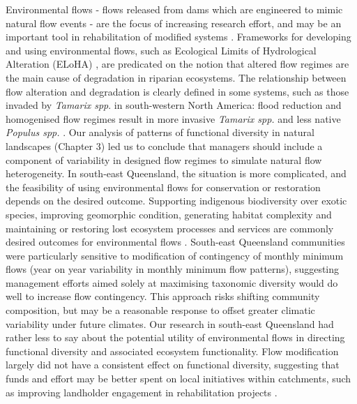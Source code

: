{{Environmental flows - flows released from dams which are engineered to mimic natural flow events - are the focus of increasing research effort, and may be an important tool in rehabilitation of modified systems \citep{Arthington2012}. Frameworks for developing and using environmental flows, such as Ecological Limits of Hydrological Alteration (ELoHA) \citep{Poff2010a}, are predicated on the notion that altered flow regimes are the main cause of degradation in riparian ecosystems. The relationship between flow alteration and degradation is clearly defined in some systems, such as those invaded by \textit{Tamarix spp}. in south-western North America: flood reduction and homogenised flow regimes result in more invasive \textit{Tamarix spp.} and less native \textit{Populus spp.} \citep{Stromberg2007, Shafroth2010}. Our analysis of patterns of functional diversity in natural landscapes (Chapter 3) led us to conclude that managers should include a component of variability in designed flow regimes to simulate natural flow heterogeneity. In south-east Queensland, the situation is more complicated, and the feasibility of using environmental flows for conservation or restoration depends on the desired outcome. Supporting indigenous biodiversity over exotic species, improving geomorphic condition, generating habitat complexity and maintaining or restoring lost ecosystem processes and services are commonly desired outcomes for environmental flows \citep{Richter2007, Poff2010a, Meitzen2013}. South-east Queensland communities were particularly sensitive to modification of contingency of monthly minimum flows (year on year variability in monthly minimum flow patterns), suggesting management efforts aimed solely at maximising taxonomic diversity would do well to increase flow contingency. This approach risks shifting community composition, but may be a reasonable response to offset greater climatic variability under future climates. Our research in south-east Queensland had rather less to say about the potential utility of environmental flows in directing functional diversity and associated ecosystem functionality. Flow modification largely did not have a consistent effect on functional diversity, suggesting that funds and effort may be better spent on local initiatives within catchments, such as improving landholder engagement in rehabilitation projects \citep{McDonald2009}.

}}
